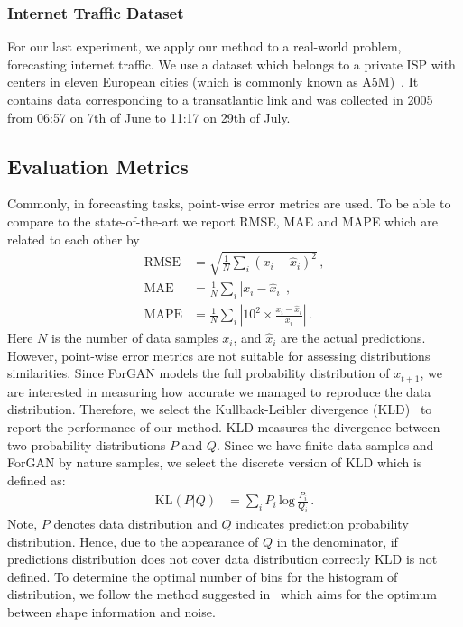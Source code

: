 \documentclass{ieeeaccess}
\begin{document}
\subsubsection{Internet Traffic Dataset}
For our last experiment, we apply our method to a real-world problem, forecasting internet traffic. We use a dataset which belongs to a private ISP with centers in eleven European cities (which is commonly known as A5M)~\cite{cortez2012multi}. It contains data corresponding to a transatlantic link and was collected in 2005 from 06:57 on 7th of June to 11:17 on 29th of July.

\subsection{Evaluation Metrics}

Commonly, in forecasting tasks, point-wise error metrics are used. To be able to compare to the state-of-the-art we report RMSE, MAE and MAPE which are related to each other by
\begin{align}
\text{RMSE}  &= \sqrt{\frac{1}{N} \sum\limits_i (x_i - \hat{x}_i)^2}\,,
\label{eq:rmse} \\
\text{MAE}   &= \frac{1}{N} \sum\limits_i \left| x_i - \hat{x}_i \right|\,,
\label{eq:mae} \\
\text{MAPE}  &= \frac{1}{N} \sum\limits_i \left| 10^2 \times \frac{ x_i - \hat{x}_i }{x_i} \right|\,.
\label{eq:mape}
\end{align}
Here $N$ is the number of data samples $x_i$, and $\hat{x}_i$ are the actual predictions. However, 
point-wise error metrics are not suitable for assessing distributions similarities. Since ForGAN models the full probability distribution of $x_{t+1}$, we are interested in measuring how accurate we managed to reproduce the data distribution. Therefore, we select the Kullback-Leibler divergence (KLD)~\cite{kullback1951} to report the performance of our method. KLD measures the divergence between two probability distributions $P$ and $Q$. Since we have finite data samples and ForGAN by nature samples, we select the discrete version of KLD which is defined as:
\begin{align}
\label{eq:kl}
\text{KL} \left( P|Q \right) &= \sum\limits_i P_i\, \text{log}\, \frac{P_i}{Q_i}\,.
\end{align}
Note, $P$ denotes data distribution and $Q$ indicates prediction probability distribution. Hence, due to the appearance of $Q$ in the denominator, if predictions distribution does not cover data distribution correctly KLD is not defined. To determine the optimal number of bins for the histogram of distribution, we follow the method suggested in~\cite{knuth2006optimal} which aims for the optimum between shape information and noise. 
\end{document}
